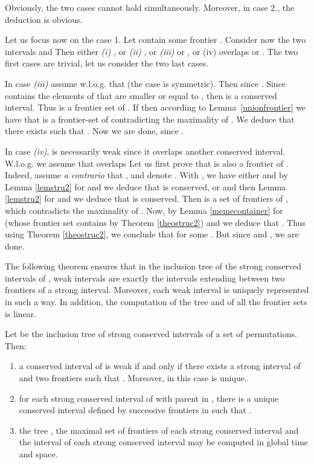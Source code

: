 \documentclass{article}
\begin{document}
\begin{preuve} Obviously, the two cases cannot hold simultaneously. Moreover,
in case 2., the deduction is obvious.

Let us focus now on the case 1. Let  contain some frontier .
Consider now the two intervals  and  Then
either {\em (i)} , or {\em (ii)}
, or {\em (iii)}  or , or {(iv)}  overlaps
 or . The two first cases are trivial, let us
consider the two last cases.

In case {\em (iii)} assume w.l.o.g. that  (the case  is
symmetric). Then  since .  Since 
contains the elements of  that are smaller or equal to , then
 is a conserved
interval. Thus  is a frontier set of . If  then according to Lemma~\ref{unionfrontier} we have that  is a frontier-set of  contradicting the maximality of
. We deduce that there exists  such that . 
Now we are done, since .

In case {\em (iv)},  is necessarily weak since it overlaps another
conserved interval. W.l.o.g. we assume that  overlaps  
Let us first prove that  is also a frontier of .  Indeed, 
assume {\em a contrario} that , and denote 
. With ,
we have either  and by Lemma \ref{lemstru2} for  and
 we deduce that  is conserved, or  and then
Lemma \ref{lemstru2} for  and  we deduce that 
is conserved. Then 
 is a set of frontiers of , which
contradicts the maximality of .
Now, by Lemma \ref{memecontainer} for  (whose
frontier set contains  by Theorem \ref{theostruc2}) and  
we deduce that . Thus using
Theorem \ref{theostruc2}, we conclude that  for
some . But since 
and , we are done.
\end{preuve}

The following theorem ensures that in the inclusion tree  of the strong conserved intervals 
of , weak intervals are exactly the intervals extending between two frontiers 
of a strong interval. Moreover, each weak interval is uniquely represented in
such a way. In addition, the computation of the tree and of all the frontier sets
is linear.


\begin{theorem}
Let  be the inclusion tree  of strong conserved intervals of a set  of permutations.
Then:
\begin{enumerate}
\item  a conserved interval  of  is weak if and only if there exists
a strong interval  of  and two frontiers  such 
that . Moreover, in this case  is unique.
\item for each strong conserved interval  of  with parent  in , there is a unique conserved
interval  defined by  
successive frontiers  in  such that . 
\item the tree , the maximal set of frontiers  of each strong conserved interval 
and the interval  of each strong conserved interval  may be computed 
in global  time and  space.
\end{enumerate}
\label{th:arbreT}
\end{theorem}
\end{document}
